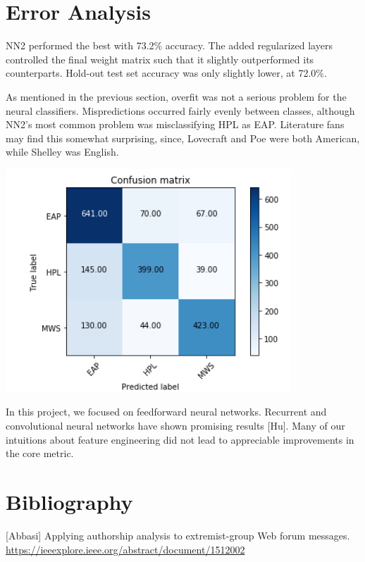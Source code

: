 \documentclass[12pt]{article}
\begin{document}
\section{Error Analysis}
NN2 performed the best with 73.2\% accuracy. The added regularized layers controlled the final weight matrix such that it slightly outperformed its counterparts. Hold-out test set accuracy was only slightly lower, at 72.0\%.

As mentioned in the previous section, overfit was not a serious problem for the neural classifiers. Mispredictions occurred fairly evenly between classes, although NN2's most common problem was misclassifying HPL as EAP. Literature fans may find this somewhat surprising, since, Lovecraft and Poe were both American, while Shelley was English.


\includegraphics[scale=.45, center]{images/conf_mat.png}

In this project, we focused on feedforward neural networks. Recurrent and convolutional neural networks have shown promising results [Hu]. Many of our intuitions about feature engineering did not lead to appreciable improvements in the core metric.



\section{Bibliography}


[Abbasi] Applying authorship analysis to extremist-group Web forum messages. \url{https://ieeexplore.ieee.org/abstract/document/1512002} \\ \\
\end{document}
